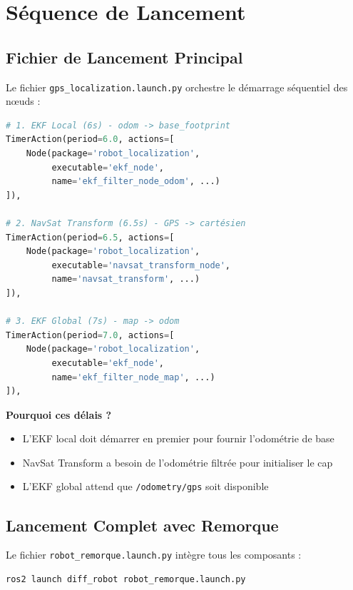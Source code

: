 \documentclass[a4paper,12pt]{article}
\begin{document}
\section{Séquence de Lancement}

\subsection{Fichier de Lancement Principal}

Le fichier \texttt{gps\_localization.launch.py} orchestre le démarrage séquentiel des nœuds :

\begin{lstlisting}[language=Python, caption=Séquence de Démarrage]
# 1. EKF Local (6s) - odom -> base_footprint
TimerAction(period=6.0, actions=[
    Node(package='robot_localization',
         executable='ekf_node',
         name='ekf_filter_node_odom', ...)
]),

# 2. NavSat Transform (6.5s) - GPS -> cartésien
TimerAction(period=6.5, actions=[
    Node(package='robot_localization',
         executable='navsat_transform_node',
         name='navsat_transform', ...)
]),

# 3. EKF Global (7s) - map -> odom
TimerAction(period=7.0, actions=[
    Node(package='robot_localization',
         executable='ekf_node',
         name='ekf_filter_node_map', ...)
]),
\end{lstlisting}

\textbf{Pourquoi ces délais ?}
\begin{itemize}
    \item L'EKF local doit démarrer en premier pour fournir l'odométrie de base
    \item NavSat Transform a besoin de l'odométrie filtrée pour initialiser le cap
    \item L'EKF global attend que \texttt{/odometry/gps} soit disponible
\end{itemize}

\subsection{Lancement Complet avec Remorque}

Le fichier \texttt{robot\_remorque.launch.py} intègre tous les composants :

\begin{lstlisting}[language=bash, caption=Commande de Lancement]
ros2 launch diff_robot robot_remorque.launch.py
\end{lstlisting}
\end{document}
